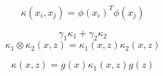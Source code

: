 \documentclass{article}
\begin{document}
\begin{equation}\label{kernel}
  \kappa(x_i,x_j) = \phi(x_i)^T\phi(x_j)
\end{equation}

\begin{equation}\label{p1}
  \gamma_1\kappa_1 + \gamma_2\kappa_2
\end{equation}
\begin{equation}\label{p2}
  \kappa_1 \otimes \kappa_2(x,z) = \kappa_1(x,z)\kappa_2(x,z)
\end{equation}

\begin{equation}\label{p3}
  \kappa(x,z) = g(x)\kappa_1(x,z)g(z)
\end{equation}
\end{document}
